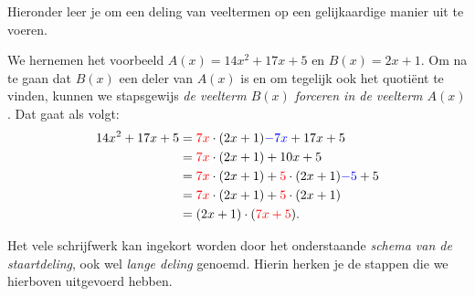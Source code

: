 \documentclass{ximera}
\begin{document}
Hieronder leer je om een deling van veeltermen op een gelijkaardige manier uit te voeren.

\begin{werkwijze} \label{werkwijze:staartdeling}
We hernemen het voorbeeld $A(x) = 14x^2+17x+5$ en $B(x) = 2x+1$. Om na te gaan dat $B(x)$ een deler van $A(x)$ is en om tegelijk ook het quoti\"ent te vinden, kunnen we stapsgewijs {\em de veelterm $B(x)$ forceren in de veelterm $A(x)$}. Dat gaat als volgt:
\begin{align*}
14x^2 + 17x + 5 
& = {\color{red}7x} \cdot (2x+1) {\color{blue}- 7x} + 17x + 5 \\
& = {\color{red}7x} \cdot (2x+1) + 10x + 5 \\
& = {\color{red}7x} \cdot (2x+1) + {\color{red}5} \cdot (2x+1) {\color{blue}- 5} + 5 \\
& = {\color{red}7x} \cdot (2x+1) + {\color{red}5} \cdot (2x+1) \\
& = (2x+1)\cdot({\color{red}7x + 5}).
\end{align*}



Het vele schrijfwerk kan ingekort worden door het onderstaande {\em schema van de staartdeling}, ook wel {\em lange deling} genoemd. Hierin herken je de stappen die we hierboven uitgevoerd hebben. 
\end{werkwijze}
\end{document}
